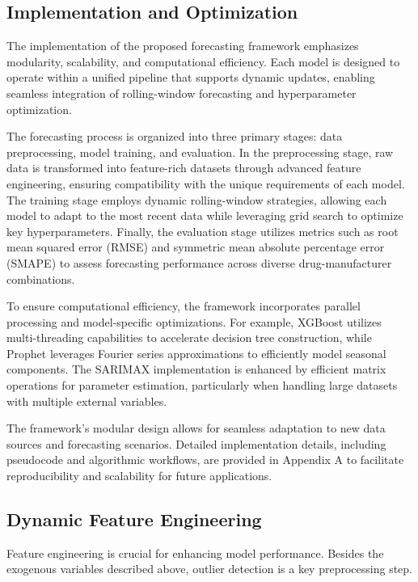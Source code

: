 \documentclass[journal]{IEEEtran}
\begin{document}
\subsection{Implementation and Optimization}

The implementation of the proposed forecasting framework emphasizes modularity, scalability, and computational efficiency. Each model is designed to operate within a unified pipeline that supports dynamic updates, enabling seamless integration of rolling-window forecasting and hyperparameter optimization.

The forecasting process is organized into three primary stages: data preprocessing, model training, and evaluation. In the preprocessing stage, raw data is transformed into feature-rich datasets through advanced feature engineering, ensuring compatibility with the unique requirements of each model. The training stage employs dynamic rolling-window strategies, allowing each model to adapt to the most recent data while leveraging grid search to optimize key hyperparameters. Finally, the evaluation stage utilizes metrics such as root mean squared error (RMSE) and symmetric mean absolute percentage error (SMAPE) to assess forecasting performance across diverse drug-manufacturer combinations.

To ensure computational efficiency, the framework incorporates parallel processing and model-specific optimizations. For example, XGBoost utilizes multi-threading capabilities to accelerate decision tree construction, while Prophet leverages Fourier series approximations to efficiently model seasonal components. The SARIMAX implementation is enhanced by efficient matrix operations for parameter estimation, particularly when handling large datasets with multiple external variables.

The framework's modular design allows for seamless adaptation to new data sources and forecasting scenarios. Detailed implementation details, including pseudocode and algorithmic workflows, are provided in Appendix A to facilitate reproducibility and scalability for future applications.



\subsection{Dynamic Feature Engineering}
Feature engineering is crucial for enhancing model performance. Besides the exogenous variables described above, outlier detection is a key preprocessing step.
\end{document}
